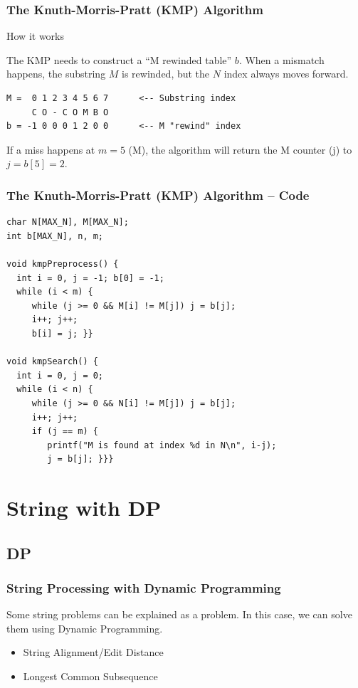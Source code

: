 \documentclass{beamer}
\begin{document}
\begin{frame}[fragile]
  \frametitle{The Knuth-Morris-Pratt (KMP) Algorithm}
    \begin{block}{How it works}

      The KMP needs to construct a ``M rewinded table'' $b$. When a mismatch happens, the substring $M$ is rewinded, but the $N$ index always moves forward.

\begin{verbatim}
M =  0 1 2 3 4 5 6 7      <-- Substring index
     C O - C O M B O
b = -1 0 0 0 1 2 0 0      <-- M "rewind" index
\end{verbatim}

If a miss happens at $m=5$ (M), the algorithm will return the M counter (j)
to $j = b[5] = 2$.
    \end{block}
\end{frame}

\begin{frame}[fragile]
  \frametitle{The Knuth-Morris-Pratt (KMP) Algorithm -- Code}
  {\smaller
  \begin{exampleblock}{}
\begin{verbatim}
char N[MAX_N], M[MAX_N];
int b[MAX_N], n, m;

void kmpPreprocess() {
  int i = 0, j = -1; b[0] = -1;
  while (i < m) {
     while (j >= 0 && M[i] != M[j]) j = b[j];
     i++; j++;
     b[i] = j; }}

void kmpSearch() {
  int i = 0, j = 0;
  while (i < n) {
     while (j >= 0 && N[i] != M[j]) j = b[j];
     i++; j++;
     if (j == m) {
        printf("M is found at index %d in N\n", i-j);
        j = b[j]; }}}
\end{verbatim}
  \end{exampleblock}
  }
\end{frame}

\section{String with DP} %
\subsection{DP}
\begin{frame}
  \frametitle{String Processing with Dynamic Programming}
  \begin{block}{}
    Some string problems can be explained as a 
    problem. In this case, we can solve them using Dynamic Programming.\bigskip

    \begin{itemize}
    \item String Alignment/Edit Distance
    \item Longest Common Subsequence
    \end{itemize}
  \end{block}
  \bigskip
\end{frame}
\end{document}
